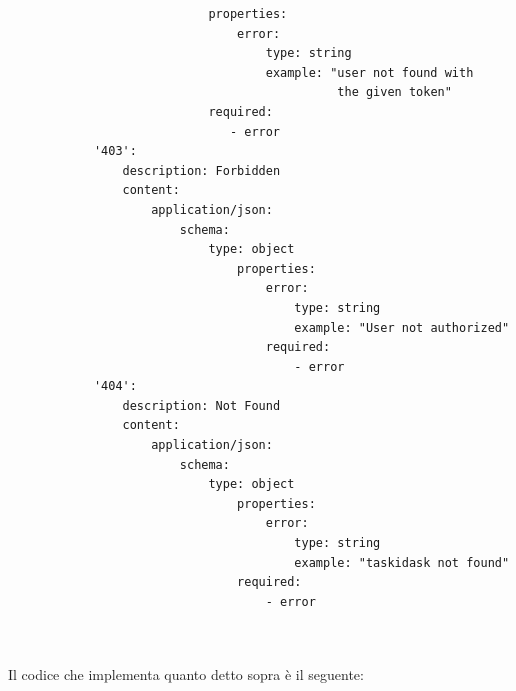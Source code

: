 \documentclass{report}
\begin{document}
\begin{verbatim}
                            properties:
                                error:
                                    type: string
                                    example: "user not found with
                                              the given token"
                            required:
                               - error
            '403':
                description: Forbidden
                content:
                    application/json:
                        schema:
                            type: object
                                properties:
                                    error:
                                        type: string
                                        example: "User not authorized"
                                    required:
                                        - error
            '404':
                description: Not Found
                content:
                    application/json:
                        schema:
                            type: object
                                properties:
                                    error:
                                        type: string
                                        example: "taskidask not found"
                                required:
                                    - error
	
	
\end{verbatim}

Il codice che implementa quanto detto sopra è il seguente:
\end{document}
